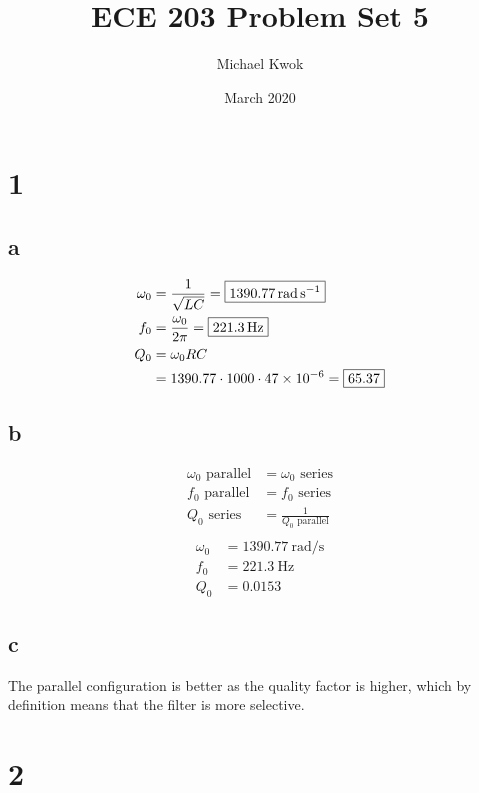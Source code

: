 \documentclass{article}
\title{ECE 203 Problem Set 5}
\author{Michael Kwok}
\date{March 2020}
\begin{document}
\maketitle
\begin{multicols}{2}
\section*{1}
\subsection*{a}

\begin{align*}
    \omega_0 &= \frac{1}{\sqrt{L C}} = \boxed{\SI{1390.77}{\radian\per\second}}\\
    f_0 &= \frac{\omega_0}{2\pi} = \boxed{\SI{221.3}{\hertz}}\\
    Q_0 &= \omega_0 R C\\
    &= 1390.77 \cdot 1000 \cdot \num{47d-6} = \boxed{65.37}
\end{align*}

\subsection*{b}

\begin{align*}
    \omega_0 \text{ parallel} &= \omega_0 \text{ series}\\
    f_0 \text{ parallel} &= f_0 \text{ series}\\
    Q_0 \text{ series} &= \frac{1}{Q_0 \text{ parallel}}\\
\end{align*}
\begin{align*}
    \omega_0 &= \boxed{\SI{1390.77}{\radian\per\second}}\\
    f_0 &= \boxed{\SI{221.3}{\hertz}}\\
    Q_0 &= \boxed{0.0153}
\end{align*}

\subsection*{c}

The parallel configuration is better as the quality factor is higher, which by definition means that the filter is more selective.

\section*{2}

\end{multicols}
\end{document}
